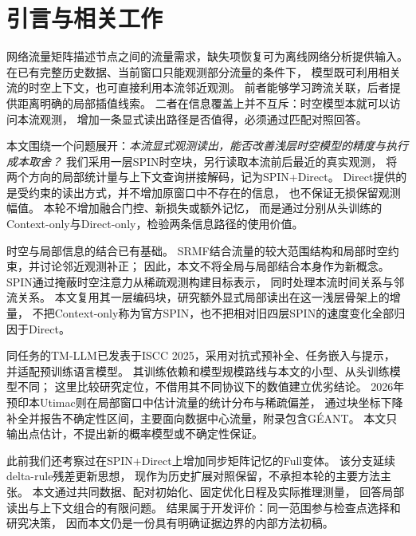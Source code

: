 \section{引言与相关工作}
网络流量矩阵描述节点之间的流量需求，缺失项恢复可为离线网络分析提供输入。
在已有完整历史数据、当前窗口只能观测部分流量的条件下，
模型既可利用相关流的时空上下文，也可直接利用本流邻近观测。
前者能够学习跨流关联，后者提供距离明确的局部插值线索。
二者在信息覆盖上并不互斥：时空模型本就可以访问本流观测，
增加一条显式读出路径是否值得，必须通过匹配对照回答。

本文围绕一个问题展开：\emph{本流显式观测读出，能否改善浅层时空模型的精度与执行成本取舍？}
我们采用一层SPIN时空块，另行读取本流前后最近的真实观测，
将两个方向的局部统计量与上下文查询拼接解码，记为SPIN+Direct。
Direct提供的是受约束的读出方式，并不增加原窗口中不存在的信息，
也不保证无损保留观测幅值。
本轮不增加融合门控、新损失或额外记忆，
而是通过分别从头训练的Context-only与Direct-only，检验两条信息路径的使用价值。

时空与局部信息的结合已有基础。
SRMF结合流量的较大范围结构和局部时空约束，并讨论邻近观测补正\cite{zhang2009srmf}；
因此，本文不将全局与局部结合本身作为新概念。
SPIN通过掩蔽时空注意力从稀疏观测构建目标表示\cite{marisca2022spin}，
同时处理本流时间关系与邻流关系。
本文复用其一层编码块，研究额外显式局部读出在这一浅层骨架上的增量，
不把Context-only称为官方SPIN，也不把相对旧四层SPIN的速度变化全部归因于Direct。

同任务的TM-LLM已发表于ISCC 2025，采用对抗式预补全、任务嵌入与提示，
并适配预训练语言模型\cite{jiang2025tmllm}。
其训练依赖和模型规模路线与本文的小型、从头训练模型不同；
这里比较研究定位，不借用其不同协议下的数值建立优劣结论。
2026年预印本Utimac则在局部窗口中估计流量的统计分布与稀疏偏差，
通过块坐标下降补全并报告不确定性区间，主要面向数据中心流量，附录包含G\'EANT\cite{liu2026utimac}。
本文只输出点估计，不提出新的概率模型或不确定性保证。

此前我们还考察过在SPIN+Direct上增加同步矩阵记忆的Full变体。
该分支延续delta-rule残差更新思想\cite{yang2024deltanet}，
现作为历史扩展对照保留，不承担本轮的主要方法主张。
本文通过共同数据、配对初始化、固定优化日程及实际推理测量，
回答局部读出与上下文组合的有限问题。
结果属于开发评价：同一范围参与检查点选择和研究决策，
因而本文仍是一份具有明确证据边界的内部方法初稿。
